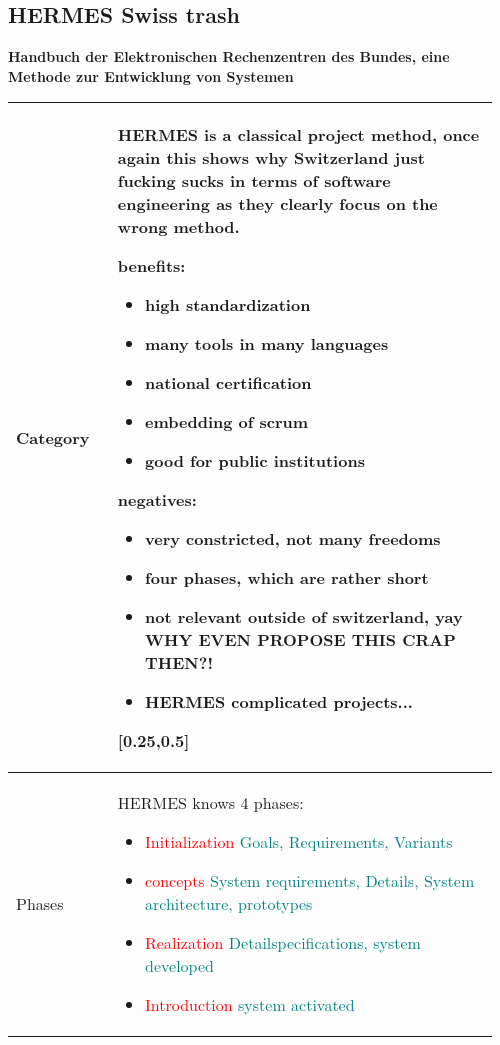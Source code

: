 \documentclass[main.tex,fontsize=8pt,paper=a4,paper=portrait,DIV=calc,]{scrartcl}
\begin{document}
\begin{table}[h!]
\subsection{HERMES Swiss trash}
\textbf{Handbuch der Elektronischen Rechenzentren des Bundes, eine Methode zur
Entwicklung von Systemen}
\begin{tabular}{|m{0.2\linewidth}|m{0.755\linewidth}|}
\hline
Category & HERMES is a classical project method, once again this shows why Switzerland just fucking sucks in terms of software engineering as they clearly focus on the wrong method.\newline
\minipg{
benefits:\newline
\begin{itemize}
\item high standardization
\item many tools in many languages
\item national certification
\item embedding of scrum
\item good for public institutions
\end{itemize}
}
{
negatives:\newline
\begin{itemize}
\item very constricted, not many freedoms
\item four phases, which are rather short
\item not relevant outside of switzerland, yay WHY EVEN PROPOSE THIS CRAP THEN?!
\item HERMES complicated projects...
\end{itemize}
}[0.25,0.5]\\
\hline
Phases & 
HERMES knows 4 phases:\newline
\begin{itemize}
  \item \textcolor{red}{Initialization} \textcolor{teal}{Goals, Requirements, Variants}
  \item \textcolor{red}{concepts} \textcolor{teal}{System requirements, Details, System architecture, prototypes}
  \item \textcolor{red}{Realization} \textcolor{teal}{Detailspecifications, system developed}
  \item \textcolor{red}{Introduction} \textcolor{teal}{system activated}
  \vspace{-3mm}
\end{itemize}\\
\hline
\end{tabular}
\end{table}
\begin{table}[h!]
\begin{tabular}{|m{0,205\linewidth}|m{0.75\linewidth}|}
\hline

\hline
\end{tabular}
\end{table}
\begin{table}[h!]
\begin{tabular}{|m{0,205\linewidth}|m{0.75\linewidth}|}
\hline

\hline
\end{tabular}
\end{table}
\end{document}
